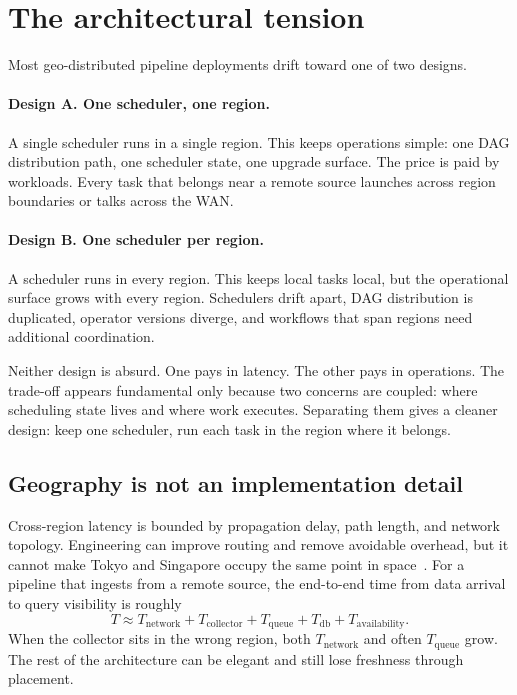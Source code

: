 \documentclass[11pt, reqno]{amsart}
\begin{document}
\section{The architectural tension}
\label{sec:tension}

Most geo-distributed pipeline deployments drift toward one of two designs.

\paragraph{Design A. One scheduler, one region.}
A single scheduler runs in a single region. This keeps operations simple: one DAG distribution path, one scheduler state, one upgrade surface. The price is paid by workloads. Every task that belongs near a remote source launches across region boundaries or talks across the WAN.

\paragraph{Design B. One scheduler per region.}
A scheduler runs in every region. This keeps local tasks local, but the operational surface grows with every region. Schedulers drift apart, DAG distribution is duplicated, operator versions diverge, and workflows that span regions need additional coordination.

Neither design is absurd. One pays in latency. The other pays in operations. The trade-off appears fundamental only because two concerns are coupled: where scheduling state lives and where work executes. Separating them gives a cleaner design: keep one scheduler, run each task in the region where it belongs.

\subsection{Geography is not an implementation detail}

Cross-region latency is bounded by propagation delay, path length, and network topology. Engineering can improve routing and remove avoidable overhead, but it cannot make Tokyo and Singapore occupy the same point in space~\cite{singla_speed_of_light,bhattacherjee_fast_networks}. For a pipeline that ingests from a remote source, the end-to-end time from data arrival to query visibility is roughly
$$
T \approx T_{\mathrm{network}} + T_{\mathrm{collector}} + T_{\mathrm{queue}} + T_{\mathrm{db}} + T_{\mathrm{availability}}.
$$
When the collector sits in the wrong region, both $T_{\mathrm{network}}$ and often $T_{\mathrm{queue}}$ grow. The rest of the architecture can be elegant and still lose freshness through placement.
\end{document}
